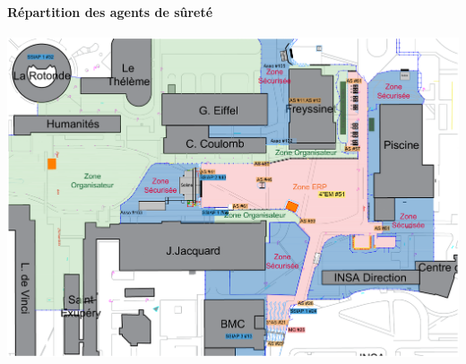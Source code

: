 \documentclass[hidelinks, paper=a4, fontsize=13pt]{report}
\begin{document}
\paragraph{Répartition des agents de sûreté}
\begin{center}
\includegraphics[width=\textwidth,keepaspectratio, angle=90]{Exports/Plan_24h_44eme-AS_Dimanche}
\end{center}

\newpage
\end{document}
